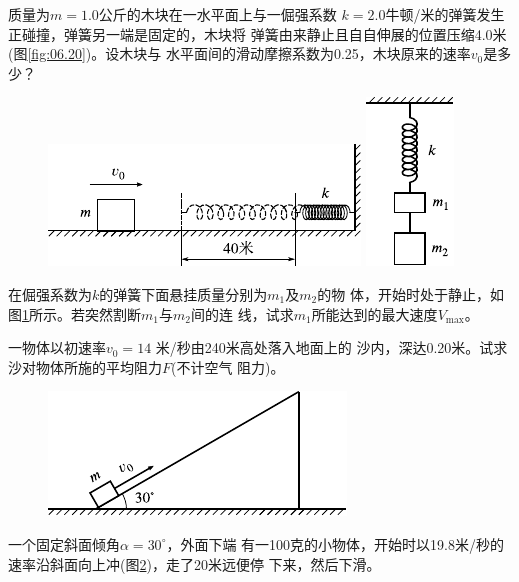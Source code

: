 \begin{exercises}
\exercise 质量为$ m = 1.0 $公斤的木块在一水平面上与一倔强系数
$ k = 2.0 $牛顿/米的弹簧发生正碰撞，弹簧另一端是固定的，木块将
弹簧由来静止且自自伸展的位置压缩4.0米(图\ref{fig:06.20})。设木块与
水平面间的滑动摩擦系数为0.25，木块原来的速率$ v _ { 0 } $是多少？
\begin{figure}[h]
  \begin{minipage}[b]{0.7\linewidth}
    \centering
    \includegraphics{figure/fig06.20}
    \caption{}
    \label{fig:06.20}
  \end{minipage}
  \hfill
  \begin{minipage}[b]{0.25\linewidth}
    \centering
    \includegraphics{figure/fig06.21}
    \caption{}
    \label{fig:06.21}
  \end{minipage}
\vspace{-0.8em}
\end{figure}

\exercise 在倔强系数为$ k $的弹簧下面悬挂质量分别为$ m_1 $及$ m_2 $的物
体，开始时处于静止，如图\ref{fig:06.21}\;所示。若突然割断$ m _ { 1 } $与$ m_2 $间的连
线，试求$ m _ { 1 } $所能达到的最大速度$ V_{\max} $。

\exercise 一物体以初速率$ v _ { 0 } = 14 $ 米/秒由240米高处落入地面上的
沙内，深达0.20米。试求沙对物体所施的平均阻力$ F $(不计空气
阻力)。

\begin{figure}
  \centering
  \includegraphics{figure/fig06.22}
  \caption{}
  \label{fig:06.22}
\end{figure}
\exercise 一个固定斜面倾角$ \alpha = 30 ^ { \circ } $，外面下端
有一100克的小物体，开始时以19.8米/秒的
速率沿斜面向上冲(图\ref{fig:06.22})，走了20米远便停
下来，然后下滑。


\end{exercises}
